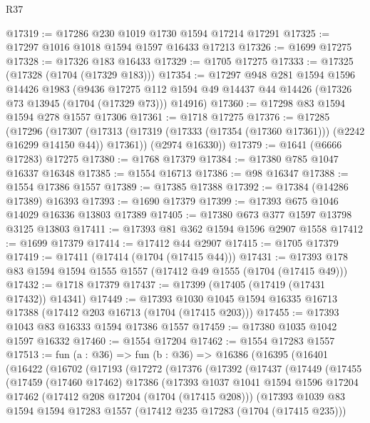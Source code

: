 \begin{lexlean}{R37}
\begin{coremodule}
@17319 := @17286 @230 @1019 @1730 @1594 @17214 @17291
@17325 := @17297 @1016 @1018 @1594 @1597 @16433 @17213
@17326 := @1699 @17275
@17328 := @17326 @183 @16433
@17329 := @1705 @17275
@17333 := @17325 (@17328 (@1704 (@17329 @183)))
@17354 := @17297
    @948
    @281
    @1594
    @1596
    @14426
    @1983
    (@9436 @17275 @112 @1594 @49 @14437 @44 @14426 (@17326 @73 @13945 (@1704 (@17329 @73))) @14916)
@17360 := @17298 @83 @1594 @1594 @278 @1557 @17306
@17361 := @1718 @17275
@17376 := @17285
    (@17296
      (@17307 (@17313 (@17319 (@17333 (@17354 (@17360 @17361))) (@2242 @16299 @14150 @44)) @17361))
      (@2974 @16330))
@17379 := @1641 (@6666 @17283) @17275
@17380 := @1768 @17379
@17384 := @17380 @785 @1047 @16337 @16348
@17385 := @1554 @16713
@17386 := @98 @16347
@17388 := @1554 @17386 @1557
@17389 := @17385 @17388
@17392 := @17384 (@14286 @17389) @16393
@17393 := @1690 @17379
@17399 := @17393 @675 @1046 @14029 @16336 @13803 @17389
@17405 := @17380 @673 @377 @1597 @13798 @3125 @13803
@17411 := @17393 @81 @362 @1594 @1596 @2907 @1558
@17412 := @1699 @17379
@17414 := @17412 @44 @2907
@17415 := @1705 @17379
@17419 := @17411 (@17414 (@1704 (@17415 @44)))
@17431 := @17393 @178 @83 @1594 @1594 @1555 @1557 (@17412 @49 @1555 (@1704 (@17415 @49)))
@17432 := @1718 @17379
@17437 := @17399 (@17405 (@17419 (@17431 @17432)) @14341)
@17449 := @17393 @1030 @1045 @1594 @16335 @16713 @17388 (@17412 @203 @16713 (@1704 (@17415 @203)))
@17455 := @17393 @1043 @83 @16333 @1594 @17386 @1557
@17459 := @17380 @1035 @1042 @1597 @16332
@17460 := @1554 @17204
@17462 := @1554 @17283 @1557
@17513 := fun (a : @36) =>
  fun (b : @36) =>
  @16386
    (@16395
      (@16401
        (@16422
          (@16702
            (@17193
              (@17272
                (@17376
                  (@17392
                    (@17437
                      (@17449
                        (@17455
                          (@17459
                            (@17460 @17462)
                            @17386
                            (@17393
                              @1037
                              @1041
                              @1594
                              @1596
                              @17204
                              @17462
                              (@17412 @208 @17204 (@1704 (@17415 @208)))
                              (@17393
                                @1039
                                @83
                                @1594
                                @1594
                                @17283
                                @1557
                                (@17412 @235 @17283 (@1704 (@17415 @235)))

\end{coremodule}
\end{lexlean}
